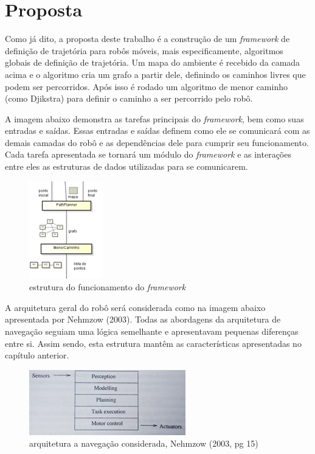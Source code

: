 \chapter[Proposta]{Proposta}

Como já dito, a proposta deste trabalho é a construção de um \textit{framework} de definição de trajetória para robôs móveis, mais especificamente, algoritmos globais de definição de trajetória. Um mapa do ambiente é recebido da camada acima e o algoritmo cria um grafo a partir dele, definindo os caminhos livres que podem ser percorridos. Após isso é rodado um algoritmo de menor caminho (como Djikstra) para definir o caminho a ser percorrido pelo robô. 

A imagem abaixo demonstra as tarefas principais do \textit{framework}, bem como suas entradas e saídas. Essas entradas e saídas definem como ele se comunicará com as demais camadas do robô e as dependências dele para cumprir seu funcionamento. Cada tarefa apresentada se tornará um módulo do \textit{framework} e as interações entre eles as estruturas de dados utilizadas para se comunicarem.
 
\begin{figure}[h]
	\centering
	\label{fig18}
		\includegraphics[keepaspectratio=true,scale=1]{figuras/framework.png}
	\caption{estrutura do funcionamento do \textit{framework}}
\end{figure} 

A arquitetura geral do robô será considerada como na imagem abaixo apresentada por Nehmzow (2003). Todas as abordagens da arquitetura de navegação seguiam uma lógica semelhante e apresentavam pequenas diferenças entre si. Assim sendo, esta estrutura mantêm as características apresentadas no capítulo anterior.

\begin{figure}[h]
	\centering
	\label{fig19}
		\includegraphics[keepaspectratio=true,scale=1]{figuras/arqusada.jpg}
	\caption{arquitetura a navegação considerada, Nehmzow (2003, pg 15)}
\end{figure}

